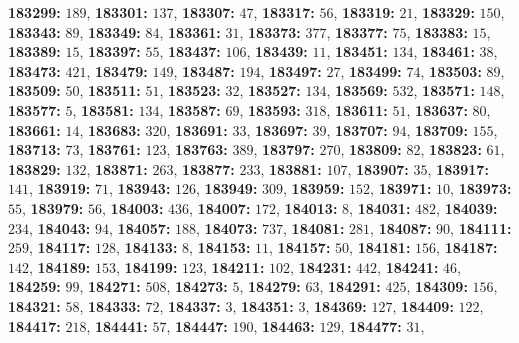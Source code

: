 \textsf{\bfseries 183299:} $189$, \textsf{\bfseries 183301:} $137$, \textsf{\bfseries 183307:} $47$, \textsf{\bfseries 183317:} $56$, \textsf{\bfseries 183319:} $21$, \textsf{\bfseries 183329:} $150$, \textsf{\bfseries 183343:} $89$, \textsf{\bfseries 183349:} $84$, \textsf{\bfseries 183361:} $31$, \textsf{\bfseries 183373:} $377$, \textsf{\bfseries 183377:} $75$, \textsf{\bfseries 183383:} $15$, \textsf{\bfseries 183389:} $15$, \textsf{\bfseries 183397:} $55$, \textsf{\bfseries 183437:} $106$, \textsf{\bfseries 183439:} $11$, \textsf{\bfseries 183451:} $134$, \textsf{\bfseries 183461:} $38$, \textsf{\bfseries 183473:} $421$, \textsf{\bfseries 183479:} $149$, \textsf{\bfseries 183487:} $194$, \textsf{\bfseries 183497:} $27$, \textsf{\bfseries 183499:} $74$, \textsf{\bfseries 183503:} $89$, \textsf{\bfseries 183509:} $50$, \textsf{\bfseries 183511:} $51$, \textsf{\bfseries 183523:} $32$, \textsf{\bfseries 183527:} $134$, \textsf{\bfseries 183569:} $532$, \textsf{\bfseries 183571:} $148$, \textsf{\bfseries 183577:} $5$, \textsf{\bfseries 183581:} $134$, \textsf{\bfseries 183587:} $69$, \textsf{\bfseries 183593:} $318$, \textsf{\bfseries 183611:} $51$, \textsf{\bfseries 183637:} $80$, \textsf{\bfseries 183661:} $14$, \textsf{\bfseries 183683:} $320$, \textsf{\bfseries 183691:} $33$, \textsf{\bfseries 183697:} $39$, \textsf{\bfseries 183707:} $94$, \textsf{\bfseries 183709:} $155$, \textsf{\bfseries 183713:} $73$, \textsf{\bfseries 183761:} $123$, \textsf{\bfseries 183763:} $389$, \textsf{\bfseries 183797:} $270$, \textsf{\bfseries 183809:} $82$, \textsf{\bfseries 183823:} $61$, \textsf{\bfseries 183829:} $132$, \textsf{\bfseries 183871:} $263$, \textsf{\bfseries 183877:} $233$, \textsf{\bfseries 183881:} $107$, \textsf{\bfseries 183907:} $35$, \textsf{\bfseries 183917:} $141$, \textsf{\bfseries 183919:} $71$, \textsf{\bfseries 183943:} $126$, \textsf{\bfseries 183949:} $309$, \textsf{\bfseries 183959:} $152$, \textsf{\bfseries 183971:} $10$, \textsf{\bfseries 183973:} $55$, \textsf{\bfseries 183979:} $56$, \textsf{\bfseries 184003:} $436$, \textsf{\bfseries 184007:} $172$, \textsf{\bfseries 184013:} $8$, \textsf{\bfseries 184031:} $482$, \textsf{\bfseries 184039:} $234$, \textsf{\bfseries 184043:} $94$, \textsf{\bfseries 184057:} $188$, \textsf{\bfseries 184073:} $737$, \textsf{\bfseries 184081:} $281$, \textsf{\bfseries 184087:} $90$, \textsf{\bfseries 184111:} $259$, \textsf{\bfseries 184117:} $128$, \textsf{\bfseries 184133:} $8$, \textsf{\bfseries 184153:} $11$, \textsf{\bfseries 184157:} $50$, \textsf{\bfseries 184181:} $156$, \textsf{\bfseries 184187:} $142$, \textsf{\bfseries 184189:} $153$, \textsf{\bfseries 184199:} $123$, \textsf{\bfseries 184211:} $102$, \textsf{\bfseries 184231:} $442$, \textsf{\bfseries 184241:} $46$, \textsf{\bfseries 184259:} $99$, \textsf{\bfseries 184271:} $508$, \textsf{\bfseries 184273:} $5$, \textsf{\bfseries 184279:} $63$, \textsf{\bfseries 184291:} $425$, \textsf{\bfseries 184309:} $156$, \textsf{\bfseries 184321:} $58$, \textsf{\bfseries 184333:} $72$, \textsf{\bfseries 184337:} $3$, \textsf{\bfseries 184351:} $3$, \textsf{\bfseries 184369:} $127$, \textsf{\bfseries 184409:} $122$, \textsf{\bfseries 184417:} $218$, \textsf{\bfseries 184441:} $57$, \textsf{\bfseries 184447:} $190$, \textsf{\bfseries 184463:} $129$, \textsf{\bfseries 184477:} $31$, 
